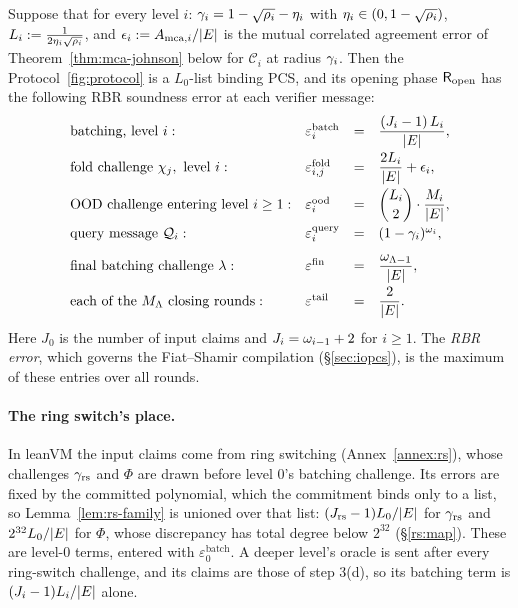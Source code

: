 \begin{theorem}\label{thm:rbr}
Suppose that for every level $i$: $\gamma_i = 1 - \sqrt{\rho_i} - \eta_i$ with $\eta_i \in (0, 1-\sqrt{\rho_i})$, $L_i := \tfrac{1}{2\eta_i\sqrt{\rho_i}}$, and $\epsilon_i := A_{\mathrm{mca},i}/|E|$ is the mutual correlated agreement error of Theorem~\ref{thm:mca-johnson} below for $\mathcal{C}_i$ at radius $\gamma_i$. Then the Protocol~\ref{fig:protocol} is a $L_0$-list binding PCS, and its opening phase $\mathsf{R}_{\mathrm{open}}$ has the following RBR soundness error at each verifier message:
\[
\begin{array}{llcl}
\textnormal{batching, level } i: & \varepsilon^{\mathrm{batch}}_i &=& \dfrac{(J_i - 1)\, L_i}{|E|} , \\[2ex]
\textnormal{fold challenge } \chi_j, \textnormal{ level } i: & \varepsilon^{\mathrm{fold}}_{i,j} &=& \dfrac{2 L_i}{|E|} + \epsilon_i , \\[2ex]
\textnormal{OOD challenge entering level } i \ge 1: & \varepsilon^{\mathrm{ood}}_i &=& \dbinom{L_i}{2} \cdot \dfrac{M_i}{|E|} , \\[2ex]
\textnormal{query message } \mathcal{Q}_i: & \varepsilon^{\mathrm{query}}_i &=& (1 - \gamma_i)^{\omega_i} , \\[2ex]
\textnormal{final batching challenge } \lambda: & \varepsilon^{\mathrm{fin}} &=& \dfrac{\omega_{\Lambda-1}}{|E|} , \\[2ex]
\textnormal{each of the } M_\Lambda \textnormal{ closing rounds}: & \varepsilon^{\mathrm{tail}} &=& \dfrac{2}{|E|} .
\end{array}
\]
Here $J_0$ is the number of input claims and $J_i = \omega_{i-1} + 2$ for $i \ge 1$. The \emph{RBR error}, which governs the Fiat--Shamir compilation (\S\ref{sec:iopcs}), is the maximum of these entries over all rounds.
\end{theorem}

\paragraph{The ring switch's place.} In leanVM the input claims come from ring switching (Annex~\ref{annex:rs}), whose challenges $\gamma_{\mathrm{rs}}$ and $\Phi$ are drawn before level $0$'s batching challenge. Its errors are fixed by the committed polynomial, which the commitment binds only to a list, so Lemma~\ref{lem:rs-family} is unioned over that list: $(J_{\mathrm{rs}} - 1) L_0/|E|$ for $\gamma_{\mathrm{rs}}$ and $2^{32} L_0/|E|$ for $\Phi$, whose discrepancy has total degree below $2^{32}$ (\S\ref{rs:map}). These are level-$0$ terms, entered with $\varepsilon^{\mathrm{batch}}_0$. A deeper level's oracle is sent after every ring-switch challenge, and its claims are those of step 3(d), so its batching term is $(J_i - 1) L_i/|E|$ alone.

